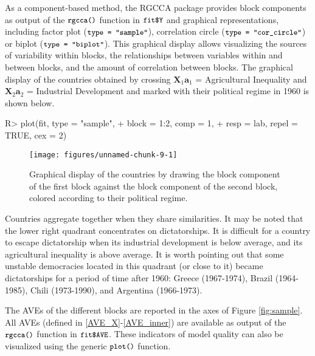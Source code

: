 \documentclass[
]{jss}
\begin{document}
\normalsize

As a component-based method, the RGCCA package provides block components
as output of the \(\small{\texttt{rgcca()}}\) function in
\(\small{\texttt{fit\$Y}}\) and graphical representations, including
factor plot (\(\small{\texttt{type = "sample"}}\)), correlation circle
(\(\small{\texttt{type = "cor\_circle"}}\)) or biplot
(\(\small{\texttt{type = "biplot"}}\)). This graphical display allows
visualizing the sources of variability within blocks, the relationships
between variables within and between blocks, and the amount of
correlation between blocks. The graphical display of the countries
obtained by crossing \(\mathbf X_1 \mathbf a_1\) = Agricultural
Inequality and \(\mathbf X_2 \mathbf a_2\) = Industrial Development and
marked with their political regime in 1960 is shown below.

\footnotesize

\begin{CodeChunk}
\begin{CodeInput}
R> plot(fit, type = "sample",
+      block = 1:2, comp = 1,
+      resp = lab, repel = TRUE, cex = 2)
\end{CodeInput}
\begin{figure}[H]

{\centering \texttt{[image: figures/unnamed-chunk-9-1]} 

}

\caption{\label{fig:sample}Graphical display of the countries by drawing the block component of the first block against the block component of the second block, colored according to their political regime.}\label{fig:unnamed-chunk-9}
\end{figure}
\end{CodeChunk}

\normalsize

Countries aggregate together when they share similarities. It may be
noted that the lower right quadrant concentrates on dictatorships. It is
difficult for a country to escape dictatorship when its industrial
development is below average, and its agricultural inequality is above
average. It is worth pointing out that some unstable democracies located
in this quadrant (or close to it) became dictatorships for a period of
time after 1960: Greece (1967-1974), Brazil (1964-1985), Chili
(1973-1990), and Argentina (1966-1973).

The AVEs of the different blocks are reported in the axes of Figure
\ref{fig:sample}. All AVEs (defined in \ref{AVE_X}-\ref{AVE_inner}) are
available as output of the \(\small{\texttt{rgcca()}}\) function in
\(\small{\texttt{fit\$AVE}}\). These indicators of model quality can
also be visualized using the generic \(\small{\texttt{plot()}}\)
function.
\end{document}
